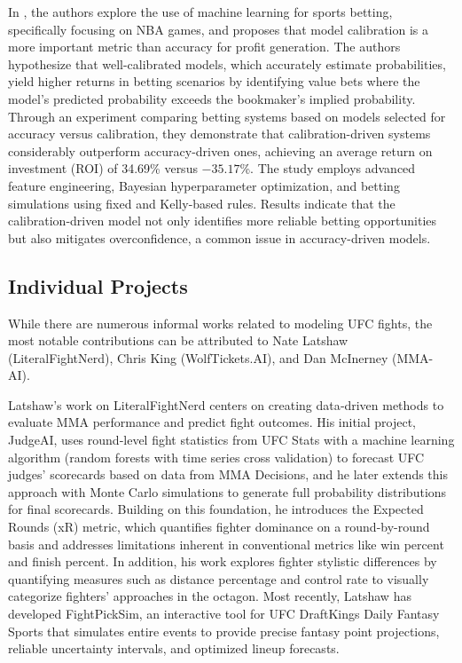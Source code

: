 \documentclass[12pt,twoside]{report}
\begin{document}
In \citep{walsh_2024}, the authors explore the use of machine learning for sports betting, specifically focusing on NBA games, and proposes that model calibration is a more important metric than accuracy for profit generation. The authors hypothesize that well-calibrated models, which accurately estimate probabilities, yield higher returns in betting scenarios by identifying value bets where the model’s predicted probability exceeds the bookmaker’s implied probability. Through an experiment comparing betting systems based on models selected for accuracy versus calibration, they demonstrate that calibration-driven systems considerably outperform accuracy-driven ones, achieving an average return on investment (ROI) of 34.69\% versus $-35.17$\%. The study employs advanced feature engineering, Bayesian hyperparameter optimization, and betting simulations using fixed and Kelly-based rules. Results indicate that the calibration-driven model not only identifies more reliable betting opportunities but also mitigates overconfidence, a common issue in accuracy-driven models.


\subsection{Individual Projects}
While there are numerous informal works related to modeling UFC fights, the most notable contributions can be attributed to Nate Latshaw (LiteralFightNerd), Chris King (WolfTickets.AI), and Dan McInerney (MMA-AI).

Latshaw’s work on LiteralFightNerd \citep{latshaw_fightnerd} centers on creating data‐driven methods to evaluate MMA performance and predict fight outcomes. His initial project, JudgeAI, uses round‐level fight statistics from UFC Stats with a machine learning algorithm (random forests with time series cross validation) to forecast UFC judges’ scorecards based on data from MMA Decisions, and he later extends this approach with Monte Carlo simulations to generate full probability distributions for final scorecards. Building on this foundation, he introduces the Expected Rounds (xR) metric, which quantifies fighter dominance on a round-by-round basis and addresses limitations inherent in conventional metrics like win percent and finish percent. In addition, his work explores fighter stylistic differences by quantifying measures such as distance percentage and control rate to visually categorize fighters’ approaches in the octagon. Most recently, Latshaw has developed FightPickSim, an interactive tool for UFC DraftKings Daily Fantasy Sports that simulates entire events to provide precise fantasy point projections, reliable uncertainty intervals, and optimized lineup forecasts.
\end{document}
